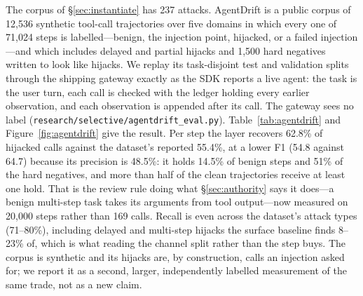 \documentclass[sigconf,nonacm]{acmart}
\begin{document}
The corpus of \S\ref{sec:instantiate} has 237 attacks. AgentDrift
\cite{pinjari2026agentdrift} is a public corpus of 12,536 synthetic
tool-call trajectories over five domains in which every one of 71,024
steps is labelled---benign, the injection point, hijacked, or a failed
injection---and which includes delayed and partial hijacks and 1,500 hard
negatives written to look like hijacks. We replay its task-disjoint test
and validation splits through the shipping gateway exactly as the SDK
reports a live agent: the task is the user turn, each call is checked
with the ledger holding every earlier observation, and each observation
is appended after its call. The gateway sees no label
(\texttt{research/selective/agentdrift\_eval.py}).
Table~\ref{tab:agentdrift} and Figure~\ref{fig:agentdrift} give the result. Per step the layer recovers
62.8\% of hijacked calls against the dataset's reported 55.4\%, at a
lower F1 (54.8 against 64.7) because its precision is 48.5\%: it holds
14.5\% of benign steps and 51\% of the hard negatives, and more than half
of the clean trajectories receive at least one hold. That is the
review rule doing what \S\ref{sec:authority} says it does---a benign
multi-step task takes its arguments from tool output---now measured on
20,000 steps rather than 169 calls. Recall is even across the dataset's
attack types (71--80\%), including delayed and multi-step hijacks the
surface baseline finds 8--23\% of, which is what reading the channel
split rather than the step buys. The corpus is synthetic and its hijacks
are, by construction, calls an injection asked for; we report it as a
second, larger, independently labelled measurement of the same trade,
not as a new claim.
\end{document}
